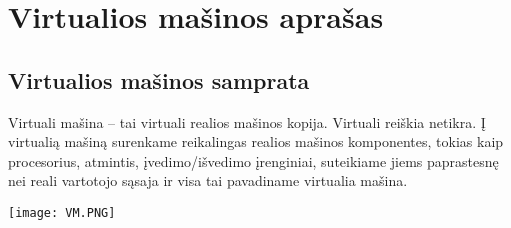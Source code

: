 \section{Virtualios mašinos aprašas}

\subsection{Virtualios mašinos samprata}

Virtuali mašina – tai virtuali realios mašinos kopija. Virtuali reiškia netikra. Į virtualią mašiną surenkame reikalingas realios mašinos komponentes, tokias kaip procesorius, atmintis, įvedimo/išvedimo įrenginiai, suteikiame jiems paprastesnę nei reali vartotojo sąsaja ir visa tai pavadiname virtualia mašina.

\texttt{[image: VM.PNG]}

